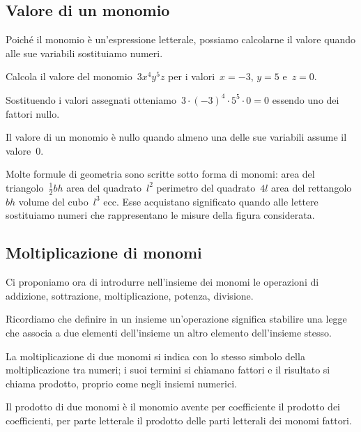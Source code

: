 \subsection{Valore di un monomio}
\label{subsec:09_monomi_valore}

Poiché il monomio è un'espressione letterale,
possiamo calcolarne il valore quando alle sue variabili sostituiamo numeri.

\begin{exrig}
 \begin{esempio}
 Calcola il valore del monomio~$3x^{4}y^{5}z$ per i valori~$x=-3$, $y=5$ e~$z=0$.

Sostituendo i valori assegnati otteniamo~$3\cdot (-3)^{4}\cdot 5^{5}\cdot 0=0$ essendo uno dei fattori nullo.
 \end{esempio}
\end{exrig}

\osservazione Il valore di un monomio è nullo quando almeno una delle sue variabili
assume il valore~0.

Molte formule di geometria sono scritte sotto forma di monomi: area del
triangolo~$\frac{1}{2}bh$ area del quadrato~$l^{2}$
perimetro del quadrato~$4l$ area del rettangolo~$bh$ volume del cubo~$l^{3}$ ecc.
Esse acquistano significato quando alle lettere sostituiamo
numeri che rappresentano le misure della figura considerata.


\subsection{Moltiplicazione di monomi}
\label{subsec:09_monomi_prodotto}

Ci proponiamo ora di introdurre nell'insieme dei monomi
le operazioni di addizione, sottrazione, moltiplicazione, potenza,
divisione.

Ricordiamo che definire in un insieme un'operazione
significa stabilire una legge che associa a due elementi
dell'insieme un altro elemento
dell'insieme stesso.

La moltiplicazione di due monomi si indica con lo stesso simbolo della
moltiplicazione tra numeri; i suoi termini si chiamano fattori e il
risultato si chiama prodotto, proprio come negli insiemi numerici.

\begin{definizione}
 Il prodotto di due monomi è il monomio avente
per coefficiente il prodotto dei coefficienti, per parte letterale il
prodotto delle parti letterali dei monomi fattori.
\end{definizione}


